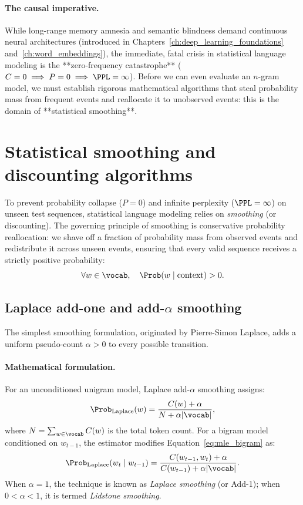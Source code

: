\documentclass[../../main.tex]{subfiles}
\begin{document}
\paragraph{The causal imperative.}
While long-range memory amnesia and semantic blindness demand continuous neural architectures (introduced in Chapters~\ref{ch:deep_learning_foundations} and~\ref{ch:word_embeddings}), the immediate, fatal crisis in statistical language modeling is the **zero-frequency catastrophe** ($C=0 \implies P=0 \implies \PPL=\infty$). Before we can even evaluate an $n$-gram model, we must establish rigorous mathematical algorithms that steal probability mass from frequent events and reallocate it to unobserved events: this is the domain of **statistical smoothing**.


\section{Statistical smoothing and discounting algorithms}
\label{sec:smoothing}

To prevent probability collapse ($P=0$) and infinite perplexity ($\PPL=\infty$) on unseen test sequences, statistical language modeling relies on \emph{smoothing} (or discounting). The governing principle of smoothing is conservative probability reallocation: we shave off a fraction of probability mass from observed events and redistribute it across unseen events, ensuring that every valid sequence receives a strictly positive probability:
\[
\forall w \in \vocab, \quad \Prob(w \mid \text{context}) > 0.
\]

\subsection{Laplace add-one and add-\texorpdfstring{$\alpha$}{alpha} smoothing}
The simplest smoothing formulation, originated by Pierre-Simon Laplace, adds a uniform pseudo-count $\alpha > 0$ to every possible transition.

\paragraph{Mathematical formulation.}
For an unconditioned unigram model, Laplace add-$\alpha$ smoothing assigns:
\begin{equation}
\label{eq:laplace_unigram}
\Prob_{\text{Laplace}}(w) = \frac{C(w) + \alpha}{N + \alpha |\vocab|},
\end{equation}
where $N = \sum_{w \in \vocab} C(w)$ is the total token count. For a bigram model conditioned on $w_{t-1}$, the estimator modifies Equation~\eqref{eq:mle_bigram} as:
\begin{equation}
\label{eq:laplace_bigram}
\Prob_{\text{Laplace}}(w_t \mid w_{t-1}) = \frac{C(w_{t-1}, w_t) + \alpha}{C(w_{t-1}) + \alpha |\vocab|}.
\end{equation}
When $\alpha = 1$, the technique is known as \emph{Laplace smoothing} (or Add-1); when $0 < \alpha < 1$, it is termed \emph{Lidstone smoothing}.
\end{document}
